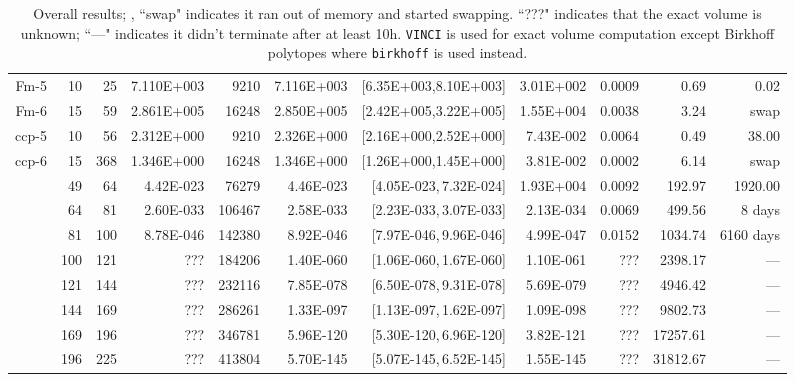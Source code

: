\documentclass[11pt,a4paper]{article}
\begin{document}
\begin{table}[t!]
\begin{tabular*}{\linewidth}{@{\extracolsep{\fill}}r@{\quad}r@{\quad}r@{\quad}r
@{\quad}r@{\quad}r@{\quad}r@{\quad}r@{~}r@{\quad}r@{\quad}r}
Fm-5 & 10 & 25 & 7.110E+003 & 9210 & 7.116E+003 & [6.35E+003,8.10E+003] & 3.01E+002 & 0.0009 & 0.69 & 0.02\\
Fm-6 & 15 & 59 & 2.861E+005 & 16248 & 2.850E+005 & [2.42E+005,3.22E+005] & 1.55E+004 & 0.0038 & 3.24 & swap\\
ccp-5 & 10 & 56 & 2.312E+000 & 9210 & 2.326E+000 & [2.16E+000,2.52E+000] & 7.43E-002 & 0.0064 & 0.49 & 38.00\\
ccp-6 & 15 & 368 & 1.346E+000 & 16248 & 1.346E+000 & [1.26E+000,1.45E+000] & 3.81E-002 & 0.0002 & 6.14 & swap\\
 & 49 & 64 & 4.42E-023 & 76279 & 4.46E-023 & [4.05E-023,\,7.32E-024] & 1.93E+004 & 0.0092 & 192.97 & 1920.00\\ 
 & 64 & 81 &  2.60E-033 & 106467 & 2.58E-033 & [2.23E-033,\,3.07E-033] & 2.13E-034 & 0.0069 & 499.56 & 8 days\\
 & 81 & 100 & 8.78E-046 & 142380 & 8.92E-046 & [7.97E-046,\,9.96E-046] & 4.99E-047 & 0.0152 & 1034.74 & 6160 days\\
 & 100 & 121 & ??? & 184206 & 1.40E-060 & [1.06E-060,\,1.67E-060] & 1.10E-061 & ??? & 2398.17 & ---\\
 & 121 & 144 & ??? & 232116 &  7.85E-078 & [6.50E-078,\,9.31E-078] & 5.69E-079 & ??? & 4946.42 & ---\\
 & 144 & 169 & ??? & 286261 &  1.33E-097 & [1.13E-097,\,1.62E-097] & 1.09E-098 & ??? & 9802.73 & ---\\
 & 169 & 196 & ??? & 346781 &  5.96E-120 & [5.30E-120,\,6.96E-120] & 3.82E-121 & ??? & 17257.61 & ---\\
 & 196 & 225 & ??? & 413804 &  5.70E-145 & [5.07E-145,\,6.52E-145] & 1.55E-145 & ??? & 31812.67 & ---\\
\end{tabular*}
\caption{ Overall results; 
, ``swap" indicates it ran out of memory and started
swapping. ``???" indicates that the exact volume is unknown; ``---" indicates it didn't terminate after at least 10h. {\tt VINCI} is used for exact volume computation except Birkhoff polytopes where {\tt birkhoff} is used instead.\label{table:vol_results}}
\end{table}
\end{document}
